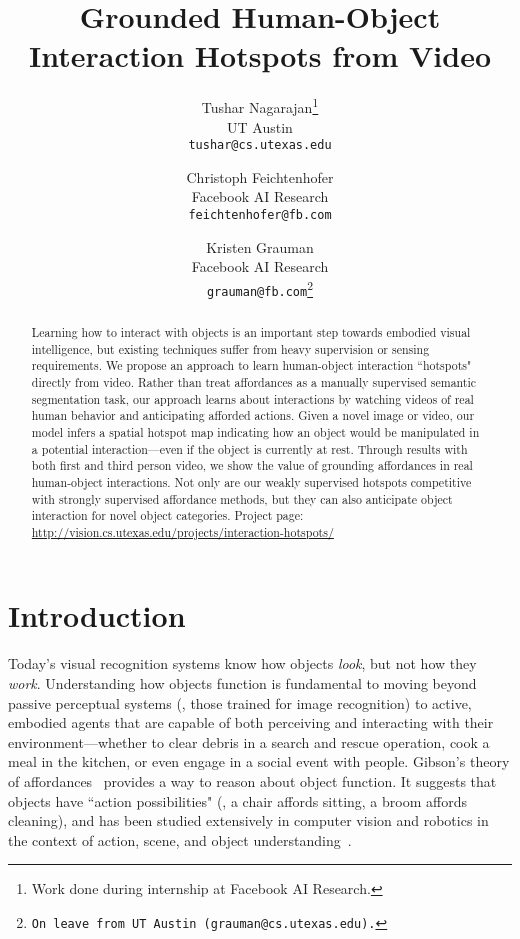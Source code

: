 \documentclass[10pt,twocolumn,letterpaper]{article}
\begin{document}
\title{Grounded Human-Object Interaction Hotspots from Video}

\author{Tushar Nagarajan\thanks{Work done during internship at Facebook AI Research.}\\
UT Austin\\
{\tt\small tushar@cs.utexas.edu}
\and
Christoph Feichtenhofer\\
Facebook AI Research\\
{\tt\small feichtenhofer@fb.com}
\and
Kristen Grauman\\
Facebook AI Research\\
{\tt\small grauman@fb.com\thanks{On leave from UT Austin (\texttt{grauman@cs.utexas.edu}).}}
}

\maketitle


\begin{abstract}
Learning how to interact with objects is an important step towards embodied visual intelligence, but existing techniques suffer from heavy supervision or sensing requirements.  
We propose an approach to learn human-object interaction ``hotspots" directly from video.
Rather than treat affordances as a manually supervised semantic segmentation task, our approach learns about interactions by watching videos of real human behavior and anticipating afforded actions.
Given a novel image or video, our model infers a spatial hotspot map indicating how an object would be manipulated in a potential interaction---even if the object is currently at rest.
Through results with both first and third person video, we show the value of grounding affordances in real human-object interactions.  Not only are our weakly supervised hotspots competitive with strongly supervised affordance methods, but they can also anticipate object interaction for novel object categories.  
Project page: \url{http://vision.cs.utexas.edu/projects/interaction-hotspots/} \end{abstract}

\section{Introduction}

Today's visual recognition systems know how objects \emph{look}, but not how they \emph{work}.
Understanding how objects function is fundamental to moving beyond passive perceptual systems (\eg, those trained for image recognition)  to active, embodied agents that are capable of both perceiving and interacting with their environment---whether to clear debris in a search and rescue operation, cook a meal in the kitchen, or even engage in a social event with people.
Gibson's theory of affordances~\cite{gibson1979ecological} provides a way to reason about object function.  It suggests that objects have ``action possibilities" (\eg, a chair affords sitting, a broom affords cleaning), and has been studied extensively in computer vision and robotics in the context of action, scene, and object understanding~\cite{hassanin2018visual}.  
\end{document}
